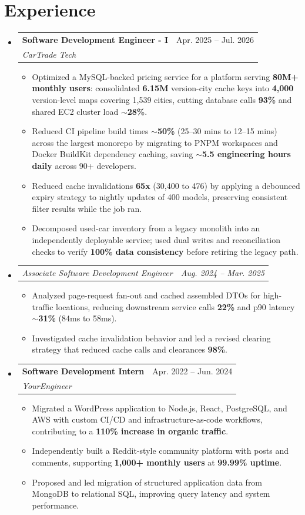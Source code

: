 \documentclass[letterpaper,11pt]{article}
\makeatletter
\newcommand{\resumeItem}[1]{
  \item\small{
    {#1 \vspace{-2pt}}
  }
}
\newcommand{\resumeSubheading}[4]{
  \vspace{-2pt}\item
    \begin{tabular*}{0.97\textwidth}[t]{l@{\extracolsep{\fill}}r}
      \textbf{#1} & #2 \\
      \textit{\small#3} & \textit{\small #4} \\
    \end{tabular*}\vspace{-7pt}
}
\newcommand{\resumeSubSubheading}[2]{
    \item
    \begin{tabular*}{0.97\textwidth}{l@{\extracolsep{\fill}}r}
      \textit{\small#1} & \textit{\small #2} \\
    \end{tabular*}\vspace{-7pt}
}
\newcommand{\resumeSubHeadingListStart}{\begin{itemize}[leftmargin=0.15in, label={}]}
\newcommand{\resumeSubHeadingListEnd}{\end{itemize}}
\newcommand{\resumeItemListStart}{\begin{itemize}}
\newcommand{\resumeItemListEnd}{\end{itemize}\vspace{-5pt}}
\makeatother
\begin{document}
\section{Experience}
\resumeSubHeadingListStart
\resumeSubheading
{Software Development Engineer - I}{Apr. 2025 -- Jul. 2026}
{CarTrade Tech}{ }
\resumeItemListStart
\resumeItem{Optimized a MySQL-backed pricing service for a platform serving \textbf{80M+ monthly users}: consolidated \textbf{6.15M} version-city cache keys into \textbf{4,000} version-level maps covering 1,539 cities, cutting database calls \textbf{93\%} and shared EC2 cluster load \textbf{$\sim$28\%}.}
\resumeItem{Reduced CI pipeline build times \textbf{$\sim$50\%} (25--30 mins to 12--15 mins) across the largest monorepo by migrating to PNPM workspaces and Docker BuildKit dependency caching, saving \textbf{$\sim$5.5 engineering hours daily} across 90+ developers.}
\resumeItem{Reduced cache invalidations \textbf{65x} (30,400 to 476) by applying a debounced expiry strategy to nightly updates of 400 models, preserving consistent filter results while the job ran.}
\resumeItem{Decomposed used-car inventory from a legacy monolith into an independently deployable service; used dual writes and reconciliation checks to verify \textbf{100\% data consistency} before retiring the legacy path.}
\resumeItemListEnd
\resumeSubSubheading
{Associate Software Development Engineer}{Aug. 2024 -- Mar. 2025}
\resumeItemListStart
\resumeItem{Analyzed page-request fan-out and cached assembled DTOs for high-traffic locations, reducing downstream service calls \textbf{22\%} and p90 latency \textbf{$\sim$31\%} (84ms to 58ms).}
\resumeItem{Investigated cache invalidation behavior and led a revised clearing strategy that reduced cache calls and clearances \textbf{98\%}.}
\resumeItemListEnd
\resumeSubheading
{Software Development Intern}{Apr. 2022 -- Jun. 2024}
{YourEngineer}{ }
\resumeItemListStart
\resumeItem{Migrated a WordPress application to Node.js, React, PostgreSQL, and AWS with custom CI/CD and infrastructure-as-code workflows, contributing to a \textbf{110\% increase in organic traffic}.}
\resumeItem{Independently built a Reddit-style community platform with posts and comments, supporting \textbf{1,000+ monthly users} at \textbf{99.99\% uptime}.}
\resumeItem{Proposed and led migration of structured application data from MongoDB to relational SQL, improving query latency and system performance.}
\resumeItemListEnd
\resumeSubHeadingListEnd


\end{document}
